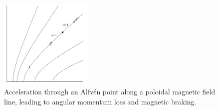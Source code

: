 \documentclass{jknotes}
\begin{document}
\begin{figure}[h]
	\centering
	\includegraphics[width=0.4\textwidth]{astro_jet.png}
	\caption{Acceleration through an Alfv\'{e}n point along a poloidal
		magnetic field line, leading to angular momentum loss and magnetic
	braking.}
\end{figure}
\end{document}
